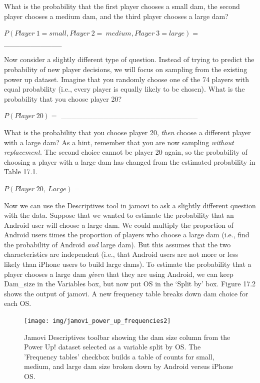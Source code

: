 \documentclass[
  openany]{scrbook}
\begin{document}
What is the probability that the first player chooses a small dam, the second player chooses a medium dam, and the third player chooses a large dam?

\(P(Player\:1 = small,Player\:2 = \:medium,Player\:3 = large) =\) \_\_\_\_\_\_\_\_\_\_\_

Now consider a slightly different type of question.
Instead of trying to predict the probability of new player decisions, we will focus on sampling from the existing power up dataset.
Imagine that you randomly choose one of the 74 players with equal probability (i.e., every player is equally likely to be chosen).
What is the probability that you choose player 20?

\(P(Player\:20) =\) \_\_\_\_\_\_\_\_\_\_\_\_\_\_\_\_\_\_\_\_\_\_\_\_\_\_

What is the probability that you choose player 20, \emph{then} choose a different player with a large dam?
As a hint, remember that you are now sampling \emph{without replacement}.
The second choice cannot be player 20 again, so the probability of choosing a player with a large dam has changed from the estimated probability in Table 17.1.

\(P(Player\:20,\:Large) =\) \_\_\_\_\_\_\_\_\_\_\_\_\_\_\_\_\_\_\_\_\_\_\_\_\_\_

Now we can use the Descriptives tool in jamovi to ask a slightly different question with the data.
Suppose that we wanted to estimate the probability that an Android user will choose a large dam.
We could multiply the proportion of Android users times the proportion of players who choose a large dam (i.e., find the probability of Android \emph{and} large dam).
But this assumes that the two characteristics are independent (i.e., that Android users are not more or less likely than iPhone users to build large dams).
To estimate the probability that a player chooses a large dam \emph{given} that they are using Android, we can keep Dam\_size in the Variables box, but now put OS in the `Split by' box.
Figure 17.2 shows the output of jamovi.
A new frequency table breaks down dam choice for each OS.

\begin{figure}
\texttt{[image: img/jamovi\_power\_up\_frequencies2]} \caption{Jamovi Descriptives toolbar showing the dam size column from the Power Up! dataset selected as a variable split by OS. The 'Frequency tables' checkbox builds a table of counts for small, medium, and large dam size broken down by Android versus iPhone OS.}\label{fig:unnamed-chunk-66}
\end{figure}
\end{document}
